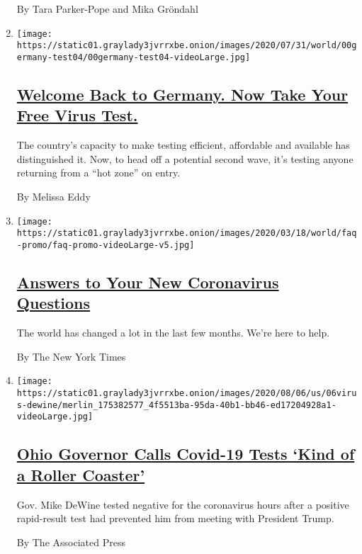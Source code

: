 \begin{enumerate}
  By Tara Parker-Pope and Mika Gröndahl
\item
  \texttt{[image: https://static01.graylady3jvrrxbe.onion/images/2020/07/31/world/00germany-test04/00germany-test04-videoLarge.jpg]}

  \hypertarget{welcome-back-to-germany-now-take-your-free-virus-test}{%
  \subsection{\texorpdfstring{\href{/2020/08/05/world/europe/germany-coronavirus-test-travelers.html}{Welcome
  Back to Germany. Now Take Your Free Virus
  Test.}}{Welcome Back to Germany. Now Take Your Free Virus Test.}}\label{welcome-back-to-germany-now-take-your-free-virus-test}}

  The country's capacity to make testing efficient, affordable and
  available has distinguished it. Now, to head off a potential second
  wave, it's testing anyone returning from a ``hot zone'' on entry.

  By Melissa Eddy
\item
  \texttt{[image: https://static01.graylady3jvrrxbe.onion/images/2020/03/18/world/faq-promo/faq-promo-videoLarge-v5.jpg]}

  \hypertarget{answers-to-your-new-coronavirus-questions}{%
  \subsection{\texorpdfstring{\href{/interactive/2020/world/coronavirus-tips-advice.html}{Answers
  to Your New Coronavirus
  Questions}}{Answers to Your New Coronavirus Questions}}\label{answers-to-your-new-coronavirus-questions}}

  The world has changed a lot in the last few months. We're here to
  help.

  By The New York Times
\item
  \texttt{[image: https://static01.graylady3jvrrxbe.onion/images/2020/08/06/us/06virus-dewine/merlin\_175382577\_4f5513ba-95da-40b1-bb46-ed17204928a1-videoLarge.jpg]}

  \hypertarget{ohio-governor-calls-covid-19-tests-kind-of-a-roller-coaster}{%
  \subsection{\texorpdfstring{\href{/video/us/politics/100000007279160/coronavirus-ohio-governor.html}{Ohio
  Governor Calls Covid-19 Tests `Kind of a Roller
  Coaster'}}{Ohio Governor Calls Covid-19 Tests `Kind of a Roller Coaster'}}\label{ohio-governor-calls-covid-19-tests-kind-of-a-roller-coaster}}

  Gov. Mike DeWine tested negative for the coronavirus hours after a
  positive rapid-result test had prevented him from meeting with
  President Trump.

  By The Associated Press
\end{enumerate}

